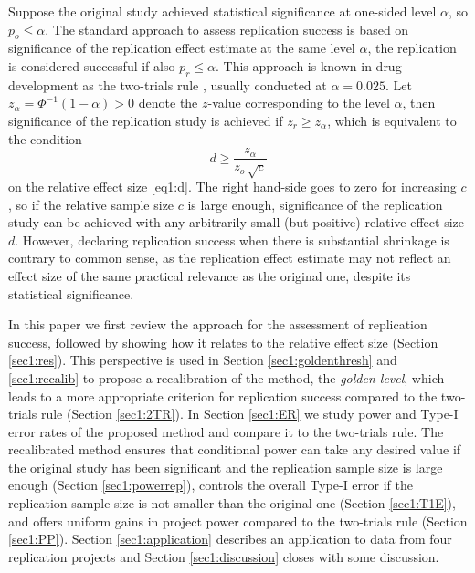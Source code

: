 Suppose the original study achieved statistical significance at one-sided level
$\alpha$, so $p_o \leq \alpha$. The standard approach to assess replication
success is based on significance of the replication effect estimate at the same
level $\alpha$, \ie{} the replication is considered successful if also
$p_r \leq \alpha$. This approach is known in drug development as the two-trials
rule \citep{Senn2008}, usually conducted at $\alpha=0.025$. Let
$z_\alpha = \Phi^{-1}(1-{\alpha})>0$ denote the $z$-value corresponding to the
level $\alpha$, then significance of the replication study is achieved if
$z_r \geq z_\alpha$, which is equivalent to the condition
\begin{equation}\label{eq1:dSig}
   d \geq \frac{z_\alpha}{z_o  \, \sqrt{c}}
\end{equation}
on the relative effect size \eqref{eq1:d}. The right hand-side goes to zero for
increasing $c$, so if the relative sample size $c$ is large enough, significance
of the replication study can be achieved with any arbitrarily small (but
positive) relative effect size $d$. However, declaring replication success when
there is substantial shrinkage is contrary to common sense, as the replication
effect estimate may not reflect an effect size of the same practical relevance
as the original one, despite its statistical significance.

In this paper we first review the \citet{Held2020} approach for the assessment
of replication success, followed by showing how it relates to the relative
effect size (Section \ref{sec1:res}). This perspective is used in Section
\ref{sec1:goldenthresh} and \ref{sec1:recalib} to propose a recalibration of the
method, the \textit{golden level}, which leads to a more appropriate criterion
for replication success compared to the two-trials rule (Section \ref{sec1:2TR}).
In Section \ref{sec1:ER} we study power and Type-I error rates of the proposed
method and compare it to the two-trials rule. The recalibrated method ensures
that conditional power can take any desired value if the original study has been
significant and the replication sample size is large enough (Section
\ref{sec1:powerrep}), controls the overall Type-I error if the replication sample
size is not smaller than the original one (Section \ref{sec1:T1E}), and offers
uniform gains in project power compared to the two-trials rule (Section
\ref{sec1:PP}). Section \ref{sec1:application} describes an application to data
from four replication projects and Section \ref{sec1:discussion} closes with some
discussion.

